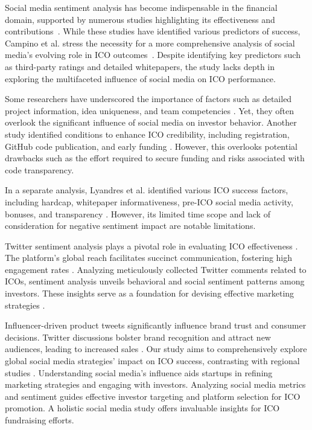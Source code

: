 \documentclass[runningheads]{llncs}
\begin{document}
Social media sentiment analysis has become indispensable in the financial domain, supported by numerous studies highlighting its effectiveness and contributions~\cite{wang2018stock,hu2021stock,wang2023learning}. While these studies have identified various predictors of success, Campino et al. stress the necessity for a more comprehensive analysis of social media's evolving role in ICO outcomes~\cite{campino2021success}. Despite identifying key predictors such as third-party ratings and detailed whitepapers, the study lacks depth in exploring the multifaceted influence of social media on ICO performance.


Some researchers have underscored the importance of factors such as detailed project information, idea uniqueness, and team competencies \cite{alchykava2021ico}. Yet, they often overlook the significant influence of social media on investor behavior. 
Another study identified conditions to enhance ICO credibility, including registration, GitHub code publication, and early funding \cite{belitski2022success}. However, this overlooks potential drawbacks such as the effort required to secure funding and risks associated with code transparency.

In a separate analysis, Lyandres et al. identified various ICO success factors, including hardcap, whitepaper informativeness, pre-ICO social media activity, bonuses, and transparency \cite{lyandres2020ico}. However, its limited time scope and lack of consideration for negative sentiment impact are notable limitations.

Twitter sentiment analysis plays a pivotal role in evaluating ICO effectiveness \cite{albrecht2020behavior}. The platform's global reach facilitates succinct communication, fostering high engagement rates \cite{mohd2020liability}. Analyzing meticulously collected Twitter comments related to ICOs, sentiment analysis unveils behavioral and social sentiment patterns among investors. These insights serve as a foundation for devising effective marketing strategies \cite{calderwood2019travel}.


Influencer-driven product tweets significantly influence brand trust and consumer decisions. Twitter discussions bolster brand recognition and attract new audiences, leading to increased sales \cite{appel2020future}. Our study aims to comprehensively explore global social media strategies' impact on ICO success, contrasting with regional studies \cite{chursook2022twitter}. Understanding social media's influence aids startups in refining marketing strategies and engaging with investors. Analyzing social media metrics and sentiment guides effective investor targeting and platform selection for ICO promotion. A holistic social media study offers invaluable insights for ICO fundraising efforts.
\end{document}
